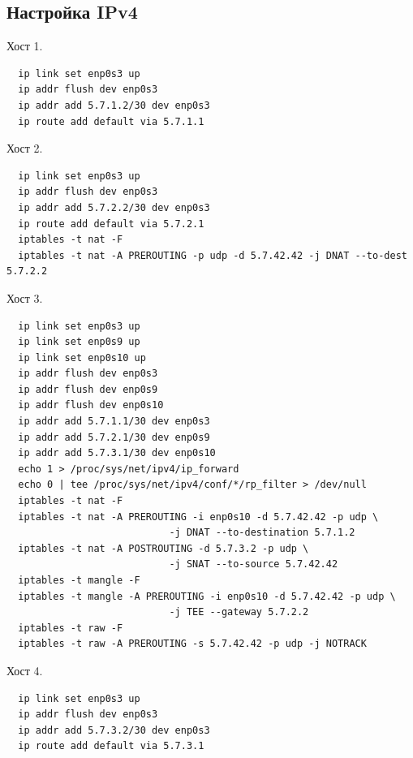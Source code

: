\documentclass[11pt, a4paper] {ncc}
\begin{document}
    \subsection*{Настройка IPv4}
    Хост 1.
    \begin{verbatim}
  ip link set enp0s3 up
  ip addr flush dev enp0s3
  ip addr add 5.7.1.2/30 dev enp0s3
  ip route add default via 5.7.1.1
    \end{verbatim}
    Хост 2.
    \begin{verbatim}
  ip link set enp0s3 up
  ip addr flush dev enp0s3
  ip addr add 5.7.2.2/30 dev enp0s3
  ip route add default via 5.7.2.1
  iptables -t nat -F
  iptables -t nat -A PREROUTING -p udp -d 5.7.42.42 -j DNAT --to-dest 5.7.2.2
    \end{verbatim}
    Хост 3.
    \begin{verbatim}
  ip link set enp0s3 up
  ip link set enp0s9 up
  ip link set enp0s10 up
  ip addr flush dev enp0s3
  ip addr flush dev enp0s9
  ip addr flush dev enp0s10
  ip addr add 5.7.1.1/30 dev enp0s3
  ip addr add 5.7.2.1/30 dev enp0s9
  ip addr add 5.7.3.1/30 dev enp0s10
  echo 1 > /proc/sys/net/ipv4/ip_forward
  echo 0 | tee /proc/sys/net/ipv4/conf/*/rp_filter > /dev/null
  iptables -t nat -F
  iptables -t nat -A PREROUTING -i enp0s10 -d 5.7.42.42 -p udp \
                            -j DNAT --to-destination 5.7.1.2
  iptables -t nat -A POSTROUTING -d 5.7.3.2 -p udp \
                            -j SNAT --to-source 5.7.42.42
  iptables -t mangle -F
  iptables -t mangle -A PREROUTING -i enp0s10 -d 5.7.42.42 -p udp \
                            -j TEE --gateway 5.7.2.2
  iptables -t raw -F
  iptables -t raw -A PREROUTING -s 5.7.42.42 -p udp -j NOTRACK
    \end{verbatim}
    Хост 4.
    \begin{verbatim}
  ip link set enp0s3 up
  ip addr flush dev enp0s3
  ip addr add 5.7.3.2/30 dev enp0s3
  ip route add default via 5.7.3.1
    \end{verbatim}
\end{document}
